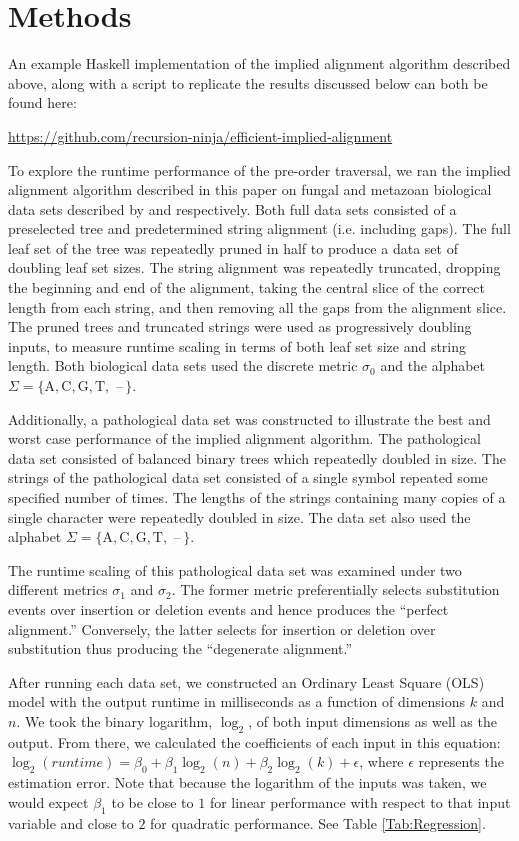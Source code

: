 \documentclass{bmcart}
\begin{document}
\section*{Methods}

An example Haskell implementation of the implied alignment algorithm described above, along with a script to replicate the results discussed below can both be found here: 

\centerline{\url{https://github.com/recursion-ninja/efficient-implied-alignment}}

To explore the runtime performance of the pre-order traversal, we ran the implied alignment algorithm described in this paper on fungal and metazoan biological data sets described by \cite{GiribetandWheeler1999} and \cite{GiribetandWheeler2001} respectively.
Both full data sets consisted of a preselected tree and predetermined string alignment (i.e. including gaps).
The full leaf set of the tree was repeatedly pruned in half to produce a data set of doubling leaf set sizes.
The string alignment was repeatedly truncated, dropping the beginning and end of the alignment, taking the central slice of the correct length from each string, and then removing all the gaps from the alignment slice.
The pruned trees and truncated strings were used as progressively doubling inputs, to measure runtime scaling in terms of both leaf set size and string length.
Both biological data sets used the discrete metric $\sigma_0$ and the alphabet $\Sigma = \{\mathrm{A, C, G, T,}$ --$\,\}$.

Additionally, a pathological data set was constructed to illustrate the best and worst case performance of the implied alignment algorithm.
The pathological data set consisted of balanced binary trees which repeatedly doubled in size.
The strings of the pathological data set consisted of a single symbol repeated some specified number of times.
The lengths of the strings containing many copies of a single character were repeatedly doubled in size.
The data set also used the alphabet $\Sigma = \{\mathrm{A, C, G, T,}$ --$\,\}$.

The runtime scaling of this pathological data set was examined under two different metrics $\sigma_1$ and $\sigma_2$.
The former metric preferentially selects substitution events over insertion or deletion events and hence produces the ``perfect alignment.''
Conversely, the latter selects for insertion or deletion over substitution thus producing the ``degenerate alignment.''


After running each data set, we constructed an Ordinary Least Square (OLS) model with the output runtime in milliseconds as a function of dimensions $k$ and $n$.
We took the binary logarithm, $\log_{2}$, of both input dimensions as well as the output.
From there, we calculated the coefficients of each input in this equation: $\log_2(runtime) = \beta_0 + \beta_1 \log_2(n) + \beta_2 \log_2(k) + \epsilon$, where $\epsilon$ represents the estimation error.
Note that because the logarithm of the inputs was taken, we would expect $\beta_1$ to be close to $1$ for linear performance with respect to that input variable and close to $2$ for quadratic performance.
See Table \ref{Tab:Regression}.
\end{document}
